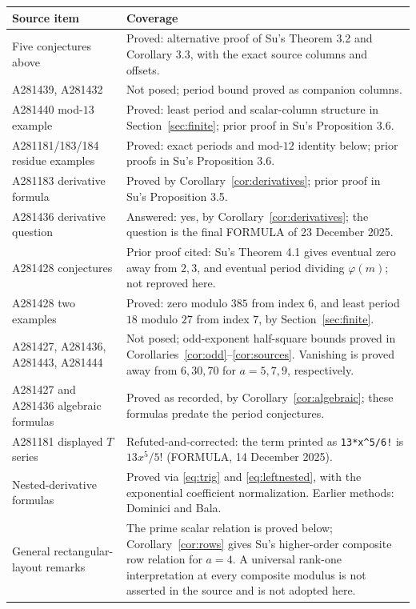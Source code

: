 \documentclass[11pt]{article}
\begin{document}
{\small
\begin{longtable}{p{.25\linewidth}p{.66\linewidth}}
\toprule
Source item & Coverage\\
\midrule
Five conjectures above & Proved: alternative proof of Su's Theorem 3.2 and Corollary 3.3, with the exact source columns and offsets.\\
A281439, A281432 & Not posed; period bound proved as companion columns.\\
A281440 mod-$13$ example & Proved: least period and scalar-column structure in Section~\ref{sec:finite}; prior proof in Su's Proposition 3.6.\\
A281181/183/184 residue examples & Proved: exact periods and mod-$12$ identity below; prior proofs in Su's Proposition 3.6.\\
A281183 derivative formula & Proved by Corollary~\ref{cor:derivatives}; prior proof in Su's Proposition 3.5.\\
A281436 derivative question & Answered: yes, by Corollary~\ref{cor:derivatives}; the question is the final FORMULA of 23 December 2025.\\
A281428 conjectures & Prior proof cited: Su's Theorem 4.1 gives eventual zero away from $2,3$, and eventual period dividing $\varphi(m)$; not reproved here.\\
A281428 two examples & Proved: zero modulo $385$ from index $6$, and least period $18$ modulo $27$ from index $7$, by Section~\ref{sec:finite}.\\
A281427, A281436, A281443, A281444 & Not posed; odd-exponent half-square bounds proved in Corollaries~\ref{cor:odd}--\ref{cor:sources}. Vanishing is proved away from $6,30,70$ for $a=5,7,9$, respectively.\\
A281427 and A281436 algebraic formulas & Proved as recorded, by Corollary~\ref{cor:algebraic}; these formulas predate the period conjectures.\\
A281181 displayed $T$ series & Refuted-and-corrected: the term printed as \texttt{13*x\^{}5/6!} is $13x^5/5!$ (FORMULA, 14 December 2025).\\
Nested-derivative formulas & Proved via \eqref{eq:trig} and \eqref{eq:leftnested}, with the exponential coefficient normalization. Earlier methods: Dominici and Bala.\\
General rectangular-layout remarks & The prime scalar relation is proved below; Corollary~\ref{cor:rows} gives Su's higher-order composite row relation for $a=4$. A universal rank-one interpretation at every composite modulus is not asserted in the source and is not adopted here.\\
\bottomrule
\end{longtable}}
\end{document}
